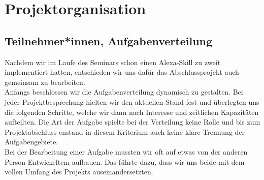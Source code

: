 \documentclass[12pt,letterpaper]{article}
\begin{document}
\section{Projektorganisation}
\subsection{Teilnehmer*innen, Aufgabenverteilung}
Nachdem wir im Laufe des Seminars schon einen Alexa-Skill zu zweit implementiert hatten, entschieden wir uns dafür das Abschlussprojekt auch gemeinsam zu bearbeiten. \\
Anfangs beschlossen wir die Aufgabenverteilung dynamisch zu gestalten. Bei jeder Projektbesprechung hielten wir den aktuellen Stand fest und überlegten uns die folgenden Schritte, welche wir dann nach Interesse und zeitlichen Kapazitäten aufteilten. Die Art der Aufgabe spielte bei der Verteilung keine Rolle und bis zum Projektabschluss enstand in diesem Kriterium auch keine klare Trennung der Aufgabengebiete.  \\ Bei der Bearbeitung einer Aufgabe mussten wir oft auf etwas von der anderen Person Entwickeltem aufbauen. Das führte dazu, dass wir uns beide mit dem vollen Umfang des Projekts auseinandersetzten. 
\end{document}
